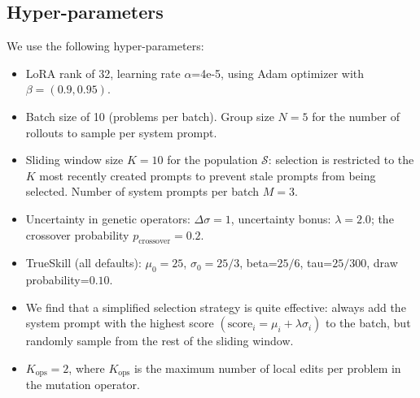 \documentclass{article}
\theoremstyle{plain}
\theoremstyle{definition}
\theoremstyle{remark}
\begin{document}
\subsection{Hyper-parameters}
\label{sec:appendix-hyperparameters}

We use the following hyper-parameters:
\begin{itemize}
    \item LoRA \citep{lora} rank of 32, learning rate $\alpha$=4e-5, using Adam optimizer \citep{kingma2014adam} with $\beta=(0.9, 0.95)$.
    \item Batch size of 10 (problems per batch). Group size $N=5$ for the number of rollouts to sample per system prompt.
    \item Sliding window size $K=10$ for the population $\mathcal{S}$: selection is restricted to the $K$ most recently created prompts to prevent stale prompts from being selected. Number of system prompts per batch $M=3$.
    \item Uncertainty in genetic operators: $\Delta\sigma=1$, uncertainty bonus: $\lambda=2.0$; the crossover probability $p_{\text{crossover}}=0.2$.
    \item TrueSkill (all defaults): $\mu_{0}=25$, $\sigma_0=25/3$, beta=$25/6$, tau=$25/300$, draw probability=$0.10$.
    \item We find that a simplified selection strategy is quite effective: always add the system prompt with the highest score $(\mathrm{score}_{i} = \mu_{i}+\lambda \sigma_{i})$ to the batch, but randomly sample from the rest of the sliding window.
    \item $K_{\text{ops}}=2$, where $K_{\text{ops}}$ is the maximum number of local edits per problem in the mutation operator.
\end{itemize}
\end{document}
